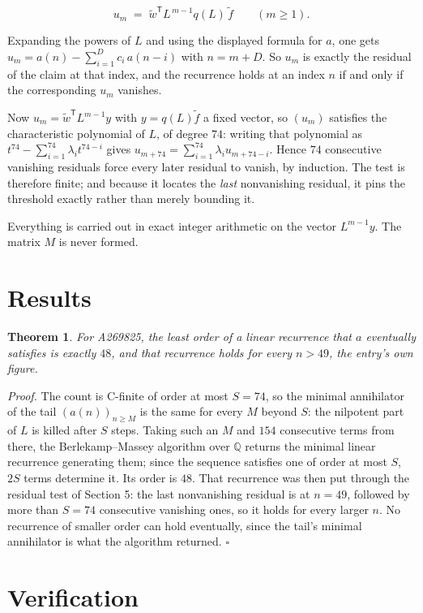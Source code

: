 \documentclass[11pt]{article}
\newtheorem{theorem}{Theorem}
\theoremstyle{definition}
\begin{document}
\[u_m \;=\; \tilde w^{\mathsf T} L^{\,m-1} q(L)\,\tilde f \qquad (m \ge 1).\]

Expanding the powers of $L$ and using the displayed formula for $a$, one gets $u_m = a(n) - \sum_{i=1}^{D} c_i\,a(n-i)$ with $n = m + D$. So $u_m$ is exactly the residual of the claim at that index, and the recurrence holds at an index $n$ if and only if the corresponding $u_m$ vanishes.

Now $u_m = \tilde w^{\mathsf T} L^{m-1} y$ with $y = q(L)\tilde f$ a fixed vector, so $(u_m)$ satisfies the characteristic polynomial of $L$, of degree $74$: writing that polynomial as $t^{74} - \sum_{i=1}^{74} \lambda_i t^{74-i}$ gives $u_{m+74} = \sum_{i=1}^{74} \lambda_i u_{m+74-i}$. Hence $74$ consecutive vanishing residuals force every later residual to vanish, by induction. The test is therefore finite; and because it locates the {\itshape last} nonvanishing residual, it pins the threshold exactly rather than merely bounding it.

Everything is carried out in exact integer arithmetic on the vector $L^{m-1}y$. The matrix $M$ is never formed.

\section{Results}

\begin{theorem} For A269825, the least order of a linear recurrence that $a$ eventually satisfies is exactly $48$, and that recurrence holds for every $n > 49$, the entry's own figure.\end{theorem}

{\itshape Proof.} The count is C-finite of order at most $S = 74$, so the minimal annihilator of the tail $(a(n))_{n \ge M}$ is the same for every $M$ beyond $S$: the nilpotent part of $L$ is killed after $S$ steps. Taking such an $M$ and $154$ consecutive terms from there, the Berlekamp--Massey algorithm over $\mathbb{Q}$ returns the minimal linear recurrence generating them; since the sequence satisfies one of order at most $S$, $2S$ terms determine it. Its order is $48$. That recurrence was then put through the residual test of Section 5: the last nonvanishing residual is at $n = 49$, followed by more than $S = 74$ consecutive vanishing ones, so it holds for every larger $n$. No recurrence of smaller order can hold eventually, since the tail's minimal annihilator is what the algorithm returned. $\square$

\section{Verification}
\end{document}
